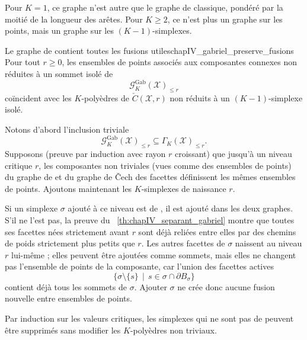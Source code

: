 Pour $K=1$, ce graphe n'est autre que le graphe de  classique, pondéré par la moitié de la longueur des arêtes. Pour $K\ge2$, ce n'est plus un graphe sur les points, mais un graphe sur les $(K-1)$-simplexes. %

\begin{Fait}{Le graphe de  contient toutes les fusions utiles}{chapIV_gabriel_preserve_fusions}
Pour tout $r\ge0$, les ensembles de points associés aux composantes connexes non réduites à un sommet isolé de
\[
    \mathcal G_K^{\mathrm{Gab}}(\mathcal X)_{\le r}
\]
coïncident avec les $K$-polyèdres de $\check C(\mathcal X,r)$ non réduits à un $(K-1)$-simplexe isolé.
\end{Fait}

\begin{Preuve}
Notons d'abord l'inclusion triviale
\[
    \mathcal G_K^{\mathrm{Gab}}(\mathcal X)_{\le r}
    \subseteq
    \Gamma_K(\mathcal X)_{\le r}.
\]
Supposons (preuve par induction avec rayon $r$ croissant) que jusqu'à un niveau critique $r$, les composantes non triviales (vues comme des ensembles de points) du graphe de  et du graphe de \v Cech des facettes définissent les mêmes ensembles de points. Ajoutons maintenant les $K$-simplexes de naissance $r$.

Si un simplexe $\sigma$ ajouté à ce niveau est de , il est ajouté dans les deux graphes. S'il ne l'est pas, la preuve du \Th~\ref{th:chapIV_separant_gabriel} montre que toutes ses facettes nées strictement avant $r$ sont déjà reliées entre elles par des chemins de poids strictement plus petits que $r$. %
Les autres facettes de $\sigma$ naissent au niveau $r$ lui-même ; elles peuvent être ajoutées comme sommets, mais elles ne changent pas l'ensemble de points de la composante, car l'union des facettes actives
\[
    \{\sigma\setminus\{s\}\, \mid \, s\in\sigma\cap\partial B_\sigma\}
\]
contient déjà tous les sommets de $\sigma$. Ajouter $\sigma$ ne crée donc aucune fusion nouvelle entre ensembles de points.

Par induction sur les valeurs critiques, les simplexes qui ne sont pas de  peuvent être supprimés sans modifier les $K$-polyèdres non triviaux.
\end{Preuve}

